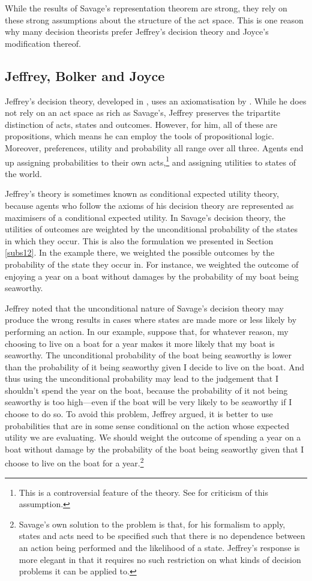 While the results of Savage's representation theorem are strong, they rely on these strong assumptions about the structure of the act space. This is one reason why many decision theorists prefer Jeffrey's decision theory and Joyce's modification thereof.

\subsection{Jeffrey, Bolker and Joyce}\label{subs24}

Jeffrey's decision theory, developed in \citet{Jeffrey1983}, uses an axiomatisation by \citet{Bolker1966}. While he does not rely on an act space as rich as Savage's, Jeffrey preserves the tripartite distinction of acts, states and outcomes. However, for him, all of these are propositions, which means he can employ the tools of propositional logic. Moreover, preferences, utility and probability all range over all three. Agents end up assigning probabilities to their own acts,\footnote{This is a controversial feature of the theory. See \citet{Spohn1977} for criticism of this assumption.} and assigning utilities to states of the world.

Jeffrey's theory is sometimes known as conditional expected utility theory, because agents who follow the axioms of his decision theory are represented as maximisers of a conditional expected utility. In Savage's decision theory, the utilities of outcomes are weighted by the unconditional probability of the states in which they occur. This is also the formulation we presented in Section \ref{subs12}. In the example there, we weighted the possible outcomes by the probability of the state they occur in. For instance, we weighted the outcome of enjoying a year on a boat without damages by the probability of my boat being seaworthy.

Jeffrey noted that the unconditional nature of Savage's decision theory may produce the wrong results in cases where states are made more or less likely by performing an action. In our example, suppose that, for whatever reason, my choosing to live on a boat for a year makes it more likely that my boat is seaworthy. The unconditional probability of the boat being seaworthy is lower than the probability of it being seaworthy given I decide to live on the boat. And thus using the unconditional probability may lead to the judgement that I shouldn't spend the year on the boat, because the probability of it not being seaworthy is too high---even if the boat will be very likely to be seaworthy if I choose to do so. To avoid this problem, Jeffrey argued, it is better to use probabilities that are in some sense conditional on the action whose expected utility we are evaluating. We should weight the outcome of spending a year on a boat without damage by the probability of the boat being seaworthy given that I choose to live on the boat for a year.\footnote{Savage's own solution to the problem is that, for his formalism to apply, states and acts need to be specified such that there is no dependence between an action being performed and the likelihood of a state. Jeffrey's response is more elegant in that it requires no such restriction on what kinds of decision problems it can be applied to.}

